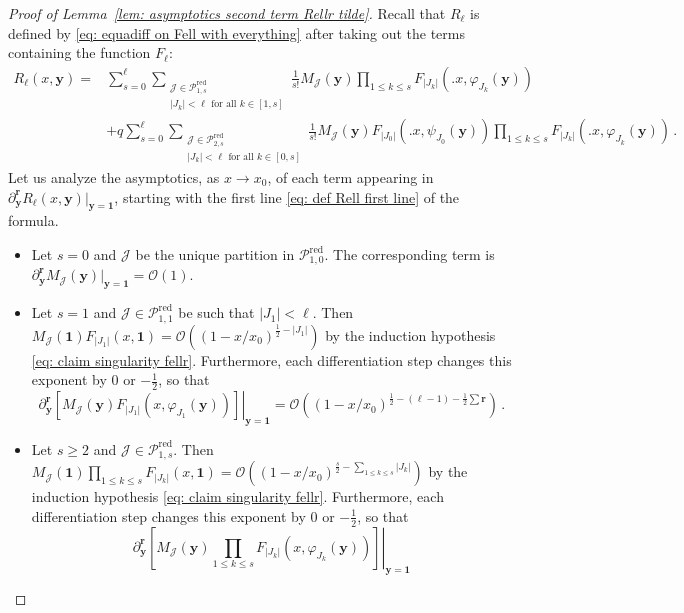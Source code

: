 \documentclass[10pt,a4paper]{amsart}
\newcommand{\abs}[1]{{\left|#1\right|}}
\newcommand{\br}{{\mathbf{r}}}
\newcommand{\by}{{\mathbf{y}}}
\newcommand{\cJ}{\mathcal{J}}
\newcommand{\cO}{\mathcal{O}}
\newcommand{\cP}{\mathcal{P}}
\newcommand{\red}{\mathrm{red}}
\begin{document}
\begin{proof}[Proof of Lemma~\ref{lem: asymptotics second term Rellr tilde}]
Recall that $R_{\ell}$ is defined by \eqref{eq: equadiff on Fell with everything} after taking out the terms containing the function $F_\ell$:
\begin{align}
    R_\ell(x,\by)
    = &\sum_{s=0}^\ell \sum_{\substack{\cJ\in \cP_{1,s}^\red \\ \abs{J_k}<\ell \text{ for all } k\in[1,s]}} \frac{1}{s!} 
    M_\cJ(\by)
    \prod_{1\le k\le s} F_{\abs{J_k}}\left(\big. x , \varphi_{J_k}(\by) \right) 
    \label{eq: def Rell first line}\\
    &+ q \sum_{s=0}^\ell \sum_{\substack{\cJ\in \cP_{2,s}^\red \\ \abs{J_k}<\ell \text{ for all } k\in[0,s]}} \frac{1}{s!} 
    M_\cJ(\by)
    F_{\abs{J_0}}\left(\big. x , \psi_{J_0}(\by) \right)
    \prod_{1\le k\le s} F_{\abs{J_k}}\left(\big. x , \varphi_{J_k}(\by) \right) \,. 
    \label{eq: def Rell second line}
\end{align}
Let us analyze the asymptotics, as $x\to x_0$, of each term appearing in $\partial_\by^\br R_\ell(x,\by) \vert_{\by=\bm{1}}$, starting with the first line \eqref{eq: def Rell first line} of the formula.
\begin{itemize}
    \item Let $s=0$ and $\cJ$ be the unique partition in $\cP_{1,0}^\red$.
    The corresponding term is $\partial_\by^\br M_\cJ(\by) \vert_{\by=\bm{1}} = \cO(1)$.
    \item Let $s=1$ and $\cJ\in\cP_{1,1}^\red$ be such that $\abs{J_1}<\ell$.
    Then $M_\cJ(\bm{1}) F_{\abs{J_1}}(x,\bm{1}) = \cO\left( (1-x/x_0)^{\frac12-\abs{J_1}} \right)$ by the induction hypothesis \eqref{eq: claim singularity fellr}.
    Furthermore, each differentiation step changes this exponent by $0$ or $-\frac12$, so that
    \[
        \partial_\by^\br \left. \left[ M_\cJ(\by) F_{\abs{J_1}}\left( x,\varphi_{J_1}(\by) \right) \right] \right\vert_{\by=\bm{1}} 
        = \cO\left( (1-x/x_0)^{\frac12-(\ell-1)-\frac12\sum\br} \right) \,.
    \]
    \item Let $s\ge2$ and $\cJ\in\cP_{1,s}^\red$.
    Then $M_\cJ(\bm{1}) \prod_{1\le k\le s} F_{\abs{J_k}}(x,\bm{1}) = \cO\left( (1-x/x_0)^{\frac{s}{2}-\sum_{1\le k\le s}\abs{J_k}} \right)$ by the induction hypothesis \eqref{eq: claim singularity fellr}.
    Furthermore, each differentiation step changes this exponent by $0$ or $-\frac12$, so that
    \[
        \partial_\by^\br \left. \left[ M_\cJ(\by) \prod_{1\le k\le s} F_{\abs{J_k}}\left( x,\varphi_{J_k}(\by) \right) \right] \right\vert_{\by=\bm{1}} 
\]
\end{itemize}
\end{proof}
\end{document}
